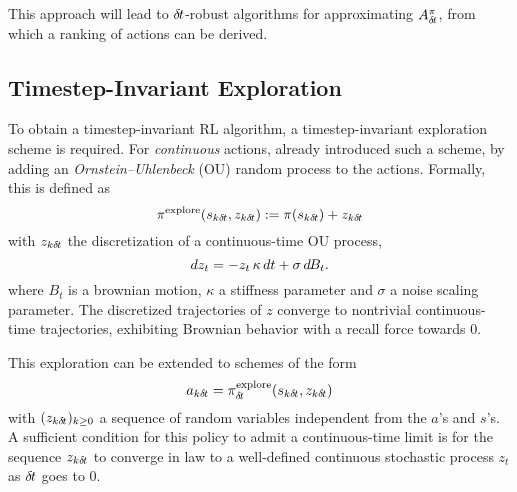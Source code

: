 This approach will lead to ${\delta\hspace{-.1em}t}$-robust algorithms for
approximating $A^\pi_{\delta\hspace{-.1em}t}$, from which a ranking of actions can be
derived.

\subsection{Timestep-Invariant Exploration}
\label{subsec:explo}

To obtain a timestep-invariant RL algorithm, a timestep-invariant
exploration scheme is required. 
For \emph{continuous} actions, \cite{ddpg} already introduced such a scheme, 
by adding an
\emph{Ornstein--Uhlenbeck} \cite{orn-uhl} (OU) random process to the
actions. Formally, this is defined as
\begin{equation}
	\pi^\text{explore}(s_{k{\delta\hspace{-.1em}t}}, z_{k{\delta\hspace{-.1em}t}}) \mathrel{\mathop{:}}=
	\pi(s_{k{\delta\hspace{-.1em}t}}) + z_{k{\delta\hspace{-.1em}t}}
\end{equation}
with $z_{k{\delta\hspace{-.1em}t}}$ the discretization of a continuous-time OU process,
\begin{equation}
	dz_t = - z_t \,\kappa\, dt + \sigma \,d\hspace{-.1em}B_t.
	\label{eq:orn_uhl}
\end{equation}
where $B_t$ is a brownian motion, $\kappa$ a stiffness parameter and
$\sigma$ a noise scaling parameter. The discretized trajectories of $z$ converge
to nontrivial continuous-time trajectories, exhibiting Brownian
behavior with a recall force towards $0$.

This exploration can be extended to schemes of the form
\begin{equation}
  \label{eq:explore}
	a_{k{\delta\hspace{-.1em}t}} = \pi^\text{explore}_{\delta\hspace{-.1em}t}(s_{k{\delta\hspace{-.1em}t}},
	z_{k{\delta\hspace{-.1em}t}})
\end{equation}
with $(z_{k{\delta\hspace{-.1em}t}})_{k\geq 0}$ a sequence of random variables independent from the $a$'s and $s$'s.
A sufficient condition for this policy to admit a continuous-time
limit is for the sequence
$z_{k{\delta\hspace{-.1em}t}}$ to converge in law to a
well-defined continuous stochastic process $z_t$ as ${\delta\hspace{-.1em}t}$ goes to $0$.

